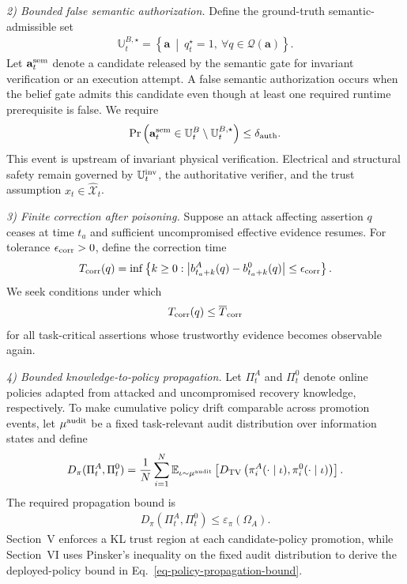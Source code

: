 \emph{2) Bounded false semantic authorization.}
Define the ground-truth semantic-admissible set
\begin{align}
\label{eq-groundtruth-semantic-set}
\mathbb{U}^{B,\star}_t=
\left\{\mathbf{a}\ \middle|\
q_t^\star=1,\ \forall q\in\mathcal{Q}(\mathbf{a})
\right\}.
\end{align}
Let $\mathbf{a}^{\rm sem}_t$ denote a candidate released by the semantic gate for invariant verification or an execution attempt. A false semantic authorization occurs when the belief gate admits this candidate even though at least one required runtime prerequisite is false. We require
\begin{align}
\label{eq-false-authorization-bound}
\Pr\left(
\mathbf{a}^{\rm sem}_t\in
\mathbb{U}^{B}_t\setminus\mathbb{U}^{B,\star}_t
\right)
\le \delta_{\rm auth}.
\end{align}
This event is upstream of invariant physical verification. Electrical and structural safety remain governed by $\mathbb{U}^{\rm inv}_t$, the authoritative verifier, and the trust assumption $x_t\in\widehat{\mathcal X}_t$.

\emph{3) Finite correction after poisoning.}
Suppose an attack affecting assertion $q$ ceases at time $t_a$ and sufficient uncompromised effective evidence resumes. For tolerance $\epsilon_{\rm corr}>0$, define the correction time
\begin{align}
\label{eq-correction-time}
T_{\rm corr}(q)=
\inf\left\{k\ge0:\left|b^{A}_{t_a+k}(q)-b^{0}_{t_a+k}(q)\right|\le\epsilon_{\rm corr}\right\}.
\end{align}
We seek conditions under which
\begin{align}
\label{eq-finite-correction}
T_{\rm corr}(q)\le\overline{T}_{\rm corr}
\end{align}
for all task-critical assertions whose trustworthy evidence becomes observable again.

\emph{4) Bounded knowledge-to-policy propagation.}
Let $\Pi^{A}_t$ and $\Pi^{0}_t$ denote online policies adapted from attacked and uncompromised recovery knowledge, respectively. To make cumulative policy drift comparable across promotion events, let $\mu^{\rm audit}$ be a fixed task-relevant audit distribution over information states and define
\begin{align}
\label{eq-policy-distance}
D_{\pi}(\Pi^{A}_t,\Pi^{0}_t)
=\frac{1}{N}\sum_{i=1}^{N}
\mathbb{E}_{\iota\sim\mu^{\rm audit}}
\left[
D_{\rm TV}
\left(
\pi^{A}_i(\cdot\mid\iota),
\pi^{0}_i(\cdot\mid\iota)
\right)
\right].
\end{align}
The required propagation bound is
\begin{align}
\label{eq-policy-propagation-bound}
D_{\pi}(\Pi^{A}_t,\Pi^{0}_t)
\le\varepsilon_{\pi}(\Omega_A).
\end{align}
Section~V enforces a KL trust region at each candidate-policy promotion, while Section~VI uses Pinsker's inequality on the fixed audit distribution to derive the deployed-policy bound in Eq.~\ref{eq-policy-propagation-bound}.


